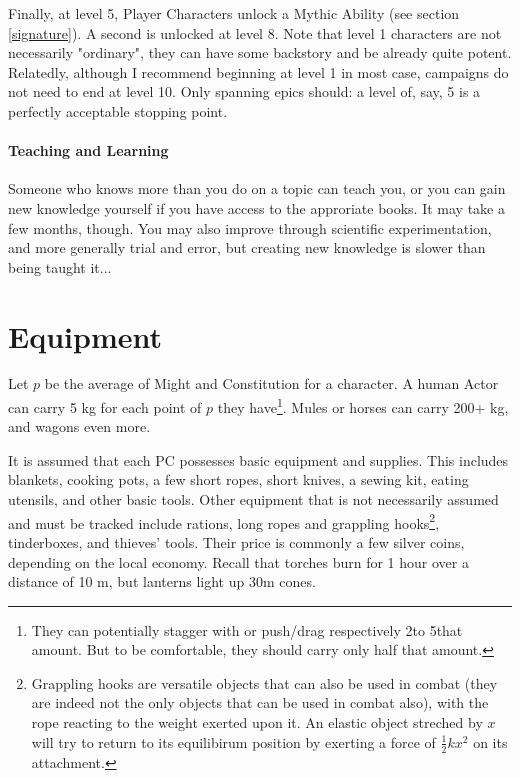Finally, at level 5, Player Characters unlock a Mythic Ability (see section \ref{signature}). A second is unlocked at level 8. Note that level 1 characters are not necessarily "ordinary", they can have some backstory and be already quite potent. Relatedly, although I recommend beginning at level 1 in most case, campaigns do not need to end at level 10. Only spanning epics should: a level of, say, 5 is a perfectly acceptable stopping point.

\paragraph{Teaching and Learning}

Someone who knows more than you do on a topic can teach you, or you can gain new knowledge yourself if you have access to the approriate books. It may take a few months, though. You may also improve through scientific experimentation, and more generally trial and error, but creating new knowledge is slower than being taught it...


\section{Equipment}

\label{equipment}

Let $p$ be the average of Might and Constitution for a character. A human Actor can carry 5 kg for each point of $p$ they have\footnote{They can potentially stagger with or push/drag respectively 2\texttimes to 5\texttimes that amount. But to be comfortable, they should carry only half that amount.}. Mules or horses can carry 200+ kg, and wagons even more.

It is assumed that each PC possesses basic equipment and supplies. This includes blankets, cooking pots, a few short ropes, short knives, a sewing kit, eating utensils, and other basic tools. Other equipment that is not necessarily assumed and must be tracked include rations, long ropes and grappling hooks\footnote{Grappling hooks are versatile objects that can also be used in combat (they are indeed not the only objects that can be used in combat also), with the rope reacting to the weight exerted upon it. An elastic object streched by $x$ will try to return to its equilibirum position by exerting a force of $\frac{1}{2}kx^2$ on its attachment.}, tinderboxes, and thieves' tools. Their price is commonly a few silver coins, depending on the local economy. Recall that torches burn for 1 hour over a distance of 10 m, but lanterns light up 30m cones.

